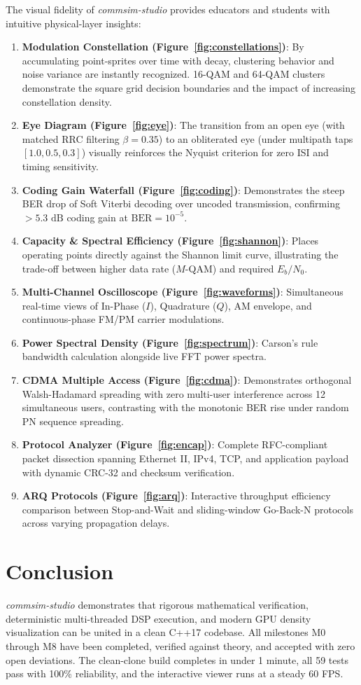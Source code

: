 \documentclass[10pt,twocolumn]{article}
\begin{document}
The visual fidelity of \textit{commsim-studio} provides educators and students with intuitive physical-layer insights:
\begin{enumerate}
    \item \textbf{Modulation Constellation (Figure~\ref{fig:constellations})}: By accumulating point-sprites over time with decay, clustering behavior and noise variance are instantly recognized. 16-QAM and 64-QAM clusters demonstrate the square grid decision boundaries and the impact of increasing constellation density.
    \item \textbf{Eye Diagram (Figure~\ref{fig:eye})}: The transition from an open eye (with matched RRC filtering $\beta=0.35$) to an obliterated eye (under multipath taps $[1.0, 0.5, 0.3]$) visually reinforces the Nyquist criterion for zero ISI and timing sensitivity.
    \item \textbf{Coding Gain Waterfall (Figure~\ref{fig:coding})}: Demonstrates the steep BER drop of Soft Viterbi decoding over uncoded transmission, confirming $> 5.3\text{ dB}$ coding gain at $\text{BER} = 10^{-5}$.
    \item \textbf{Capacity \& Spectral Efficiency (Figure~\ref{fig:shannon})}: Places operating points directly against the Shannon limit curve, illustrating the trade-off between higher data rate ($M$-QAM) and required $E_b/N_0$.
    \item \textbf{Multi-Channel Oscilloscope (Figure~\ref{fig:waveforms})}: Simultaneous real-time views of In-Phase ($I$), Quadrature ($Q$), AM envelope, and continuous-phase FM/PM carrier modulations.
    \item \textbf{Power Spectral Density (Figure~\ref{fig:spectrum})}: Carson's rule bandwidth calculation alongside live FFT power spectra.
    \item \textbf{CDMA Multiple Access (Figure~\ref{fig:cdma})}: Demonstrates orthogonal Walsh-Hadamard spreading with zero multi-user interference across 12 simultaneous users, contrasting with the monotonic BER rise under random PN sequence spreading.
    \item \textbf{Protocol Analyzer (Figure~\ref{fig:encap})}: Complete RFC-compliant packet dissection spanning Ethernet II, IPv4, TCP, and application payload with dynamic CRC-32 and checksum verification.
    \item \textbf{ARQ Protocols (Figure~\ref{fig:arq})}: Interactive throughput efficiency comparison between Stop-and-Wait and sliding-window Go-Back-N protocols across varying propagation delays.
\end{enumerate}

\section{Conclusion}
\textit{commsim-studio} demonstrates that rigorous mathematical verification, deterministic multi-threaded DSP execution, and modern GPU density visualization can be united in a clean C++17 codebase. All milestones M0 through M8 have been completed, verified against theory, and accepted with zero open deviations. The clean-clone build completes in under 1 minute, all 59 tests pass with 100\% reliability, and the interactive viewer runs at a steady 60 FPS.
\end{document}
